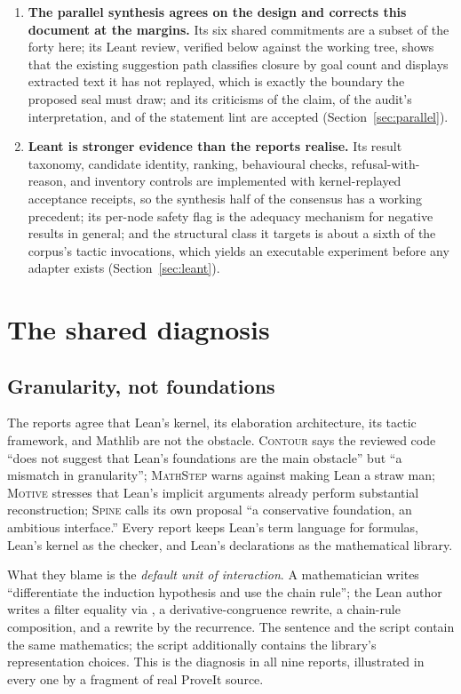 \documentclass[11pt,a4paper]{article}
\newcommand{\code}[1]{\texttt{\detokenize{#1}}}
\newcommand{\MS}{\textsc{MathStep}}
\newcommand{\Co}{\textsc{Contour}}
\newcommand{\Mv}{\textsc{Motive}}
\newcommand{\Sp}{\textsc{Spine}}
\theoremstyle{definition}
\begin{document}
\begin{enumerate}
\item \textbf{The parallel synthesis agrees on the design and corrects this document at the margins.} Its six shared commitments are a subset of the forty here; its Leant review, verified below against the working tree, shows that the existing suggestion path classifies closure by goal count and displays extracted text it has not replayed, which is exactly the boundary the proposed seal must draw; and its criticisms of the \code{says} claim, of the audit's interpretation, and of the statement lint are accepted (Section~\ref{sec:parallel}).
\item \textbf{Leant is stronger evidence than the reports realise.} Its result taxonomy, candidate identity, ranking, behavioural checks, refusal-with-reason, and inventory controls are implemented with kernel-replayed acceptance receipts, so the synthesis half of the consensus has a working precedent; its per-node safety flag is the adequacy mechanism for negative results in general; and the structural class it targets is about a sixth of the corpus's tactic invocations, which yields an executable experiment before any adapter exists (Section~\ref{sec:leant}).
\end{enumerate}

\section{The shared diagnosis}
\label{sec:diagnosis}

\subsection{Granularity, not foundations}
The reports agree that Lean's kernel, its elaboration architecture, its tactic framework, and Mathlib are not the obstacle. \Co{} says the reviewed code ``does not suggest that Lean's foundations are the main obstacle'' but ``a mismatch in granularity''; \MS{} warns against making Lean a straw man; \Mv{} stresses that Lean's implicit arguments already perform substantial reconstruction; \Sp{} calls its own proposal ``a conservative foundation, an ambitious interface.'' Every report keeps Lean's term language for formulas, Lean's kernel as the checker, and Lean's declarations as the mathematical library.

What they blame is the \emph{default unit of interaction}. A mathematician writes ``differentiate the induction hypothesis and use the chain rule''; the Lean author writes a filter equality via \code{Filter.eventuallyEq_of_mem}, a derivative-congruence rewrite, a chain-rule composition, and a rewrite by the recurrence. The sentence and the script contain the same mathematics; the script additionally contains the library's representation choices. This is the diagnosis in all nine reports, illustrated in every one by a fragment of real ProveIt source.
\end{document}
